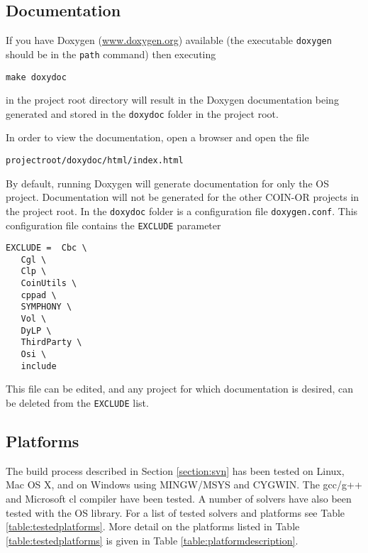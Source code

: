 \documentclass[11pt]{article}
\renewcommand{\_}{{\char"5F}}
\renewcommand{\{}{{\char"7B}}
\renewcommand{\}}{{\char"7D}}
\renewcommand{\^}{{\char"0D}}
\renewcommand{\'}{{\char"0D}}
\begin{document}
\subsection{Documentation}\label{section:documentation}

If you have Doxygen  (\url{www.doxygen.org}) available (the executable {\tt doxygen} should be in the {\tt path} command) then executing
\begin{verbatim}
make doxydoc
\end{verbatim}
in the project root directory will result in the Doxygen documentation being generated and stored in the {\tt doxydoc} folder in the project root.

In order to view the documentation, open a browser and open the file
\begin{verbatim}
projectroot/doxydoc/html/index.html
\end{verbatim}

By default, running Doxygen will generate documentation for only the  OS project.  Documentation will not be generated for the other COIN-OR projects in the project root. In the {\tt doxydoc}  folder is a configuration file {\tt doxygen.conf}.  This configuration file contains the {\tt EXCLUDE} parameter

\begin{verbatim}
EXCLUDE =  Cbc \
   Cgl \
   Clp \
   CoinUtils \
   cppad \
   SYMPHONY \
   Vol \
   DyLP \
   ThirdParty \
   Osi \
   include
\end{verbatim}

This file can be edited, and any project for which documentation is desired, can be deleted from the {\tt EXCLUDE} list.






\subsection{Platforms}

The build process described in Section \ref{section:svn} has been tested on Linux, Mac OS X, and on Windows using  MINGW/MSYS and CYGWIN. The  gcc/g++ and Microsoft  cl compiler have been tested. A number of solvers have also been tested with the OS library. For a list of tested solvers and platforms see Table \ref{table:testedplatforms}.  More detail on the platforms listed in Table  \ref{table:testedplatforms} is given in Table \ref{table:platformdescription}.
\end{document}
